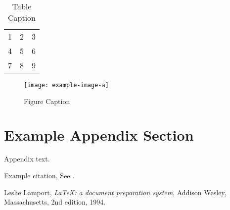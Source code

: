 \documentclass[preprint,12pt]{elsarticle}
\begin{document}
\begin{table}[t]%
\centering%
\begin{tabular}{l c r}%
  1 & 2 & 3 \\ %
  4 & 5 & 6 \\
  7 & 8 & 9 \\
\end{tabular}
\caption{Table Caption}\label{fig1}
\end{table}


\begin{figure}[t]%
\centering%
\texttt{[image: example-image-a]}
\caption{Figure Caption}\label{fig1}
\end{figure}


\appendix
\section{Example Appendix Section}
\label{app1}

Appendix text.


Example citation, See \cite{lamport94}.




\begin{thebibliography}{00}


  Leslie Lamport,
  \textit{\LaTeX: a document preparation system},
  Addison Wesley, Massachusetts,
  2nd edition,
  1994.

\end{thebibliography}
\end{document}
